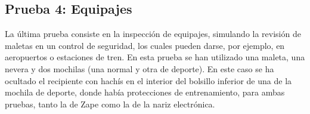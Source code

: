 \subsection{Prueba 4: Equipajes}
La última prueba consiste en la inspección de equipajes, simulando la revisión de maletas en un control de seguridad, los cuales pueden darse, por ejemplo, en aeropuertos o estaciones de tren. En esta prueba se han utilizado una maleta, una nevera y dos mochilas (una normal y otra de deporte). En este caso se ha ocultado el recipiente con hachís en el interior del bolsillo inferior de una de la mochila de deporte, donde había protecciones de entrenamiento, para ambas pruebas, tanto la de Zape como la de la nariz electrónica. 

